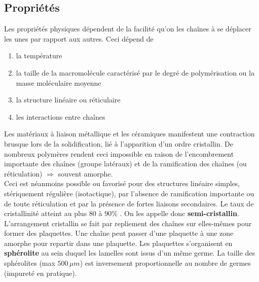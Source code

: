 	\subsection{Propriétés}
		Les propriétés physiques dépendent de la facilité qu'on les chaînes à se déplacer les unes par rapport aux autres. Ceci dépend de 
		\begin{enumerate}
			\item la température
			\item la taille de la macromolécule caractérisé par le degré de polymérisation ou la masse moléculaire moyenne
			\item la structure linéaire ou réticulaire
			\item les interactions entre chaînes
		\end{enumerate}
		Les matériaux à liaison métallique et les céramiques manifestent une contraction brusque lors de la solidification, lié à l'apparition d'un ordre cristallin. De nombreux polymères rendent ceci impossible en raison de l'encombrement importante des chaînes (groupe latéraux) et de la ramification des chaînes (ou réticulation) $\Rightarrow$ souvent amorphe. \\
		Ceci est néanmoins possible ou favorisé pour des structures linéaire simples, stériquement régulière (isotactique), par l'absence de ramification importante ou de toute réticulation et par la présence de fortes liaisons secondaires. Le taux de cristallinité atteint au plus 80 à 90\% . On les appelle donc \textbf{semi-cristallin}.  L'arrangement cristallin se fait par repliement des chaînes sur elles-mêmes pour former des plaquettes. Une chaîne peut passer d'une plaquette à une zone amorphe pour repartir dans une plaquette. Les plaquettes s'organisent en \textbf{sphérolite} au sein duquel les lamelles sont issus d'un même germe. La taille des sphérolites (max $500\, \mu m$) est inversement proportionnelle au nombre de germes (impureté en pratique).
		
